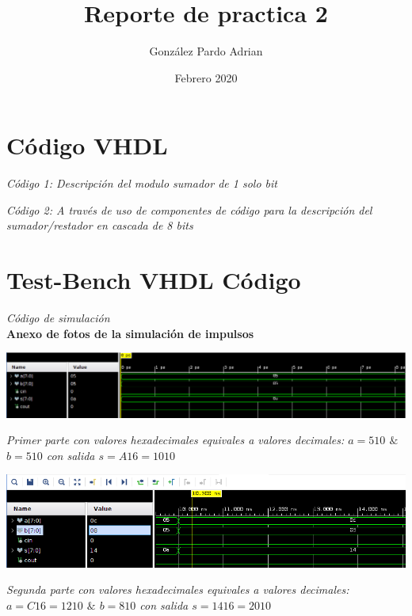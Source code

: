 \documentclass[12pt,executivepaper]{article}
\author{González Pardo Adrian}
\date{Febrero 2020}
\title{Reporte de practica 2}
\begin{document}
\maketitle
\section{Código VHDL}
\begin{center}

\textit{Código 1: Descripción del modulo sumador de 1 solo bit}
\end{center}
\begin{center}

\textit{Código 2: A través de uso de componentes de código para la descripción del sumador/restador en cascada de 8 bits}
\end{center}
\section{Test-Bench VHDL Código}
\begin{center}
    
    \textit{Código de simulación}\\
    \textbf{Anexo de fotos de la simulación de impulsos}\\
\end{center}
\begin{flushleft}
	\includegraphics[scale=0.4]{imgs/primera.png}
\end{flushleft}
\begin{center}
    \textit{Primer parte con valores hexadecimales equivales a valores decimales: $a=5{\scriptscriptstyle10}$ $\&$ $b=5{\scriptscriptstyle10}$ con salida $s = A{\scriptscriptstyle16}= 10{\scriptscriptstyle10}$}
\end{center}

\begin{flushleft}
	\includegraphics[scale=0.52]{imgs/segunda.png}
\end{flushleft}
\begin{center}
    \textit{Segunda parte con valores hexadecimales equivales a valores decimales: $a=C{\scriptscriptstyle16}=12{\scriptscriptstyle10}$ $\&$ $b=8{\scriptscriptstyle10}$ con salida $s = 14{\scriptscriptstyle16}= 20{\scriptscriptstyle10}$}
\end{center}
\end{document}
